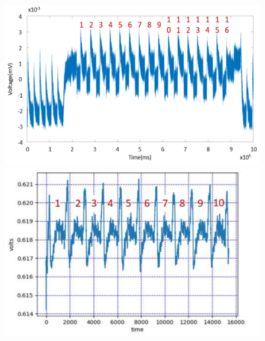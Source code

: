 \begin{frame}
    \begin{figure}
        \centering
        \begin{minipage}{0.48\textwidth}
            \centering
            \includegraphics[width=\linewidth]{main thing/Pictures/DES_SPA_trace.png}
        \end{minipage}\hfill
        \begin{minipage}{0.48\textwidth}
            \centering
            \includegraphics[width=\linewidth]{main thing/Pictures/AES_SPA_trace.png}
        \end{minipage}
    \end{figure}
\end{frame}


